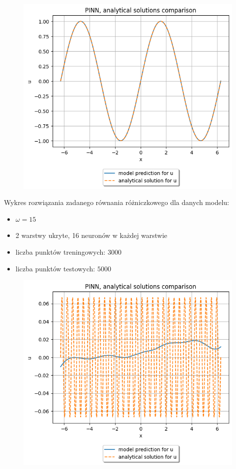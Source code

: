 \documentclass{article}
\begin{document}
\begin{figure}[H]
  \includegraphics[width=\linewidth]{figures/first.png}
\end{figure}


Wykres rozwiązania zadanego równania różniczkowego dla danych modelu:\\
\begin{itemize}
  \item $\omega = 15$\\
  \item 2 warstwy ukryte, 16 neuronów w każdej warstwie\\
  \item liczba punktów treningowych: $3000$\\
  \item liczba punktów testowych: $5000$
\end{itemize}

\begin{figure}[H]
  \includegraphics[width=\linewidth]{figures/second1.png}
\end{figure}
\end{document}
